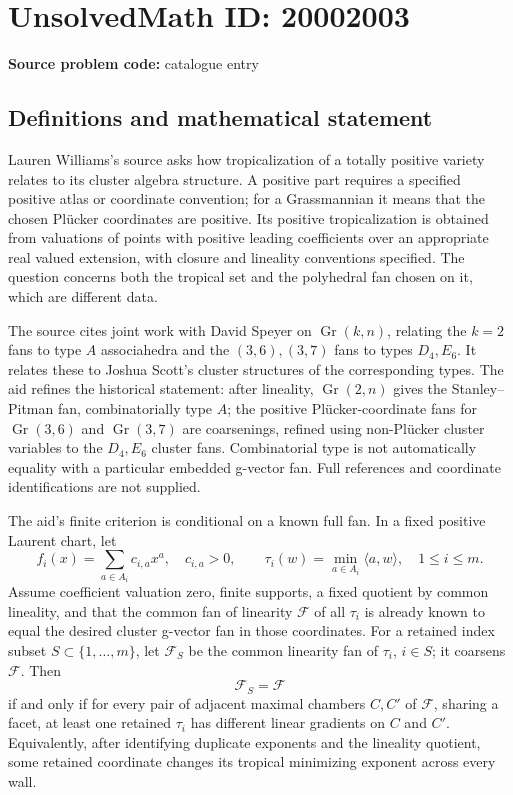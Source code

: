 \documentclass[11pt]{article}
\begin{document}
\section*{UnsolvedMath ID: 20002003}
\textbf{Source problem code:} catalogue entry
\subsection{Definitions and mathematical statement}
Lauren Williams's source asks how tropicalization of a totally positive variety relates to its cluster algebra structure. A positive part requires a specified positive atlas or coordinate convention; for a Grassmannian it means that the chosen Pl\"ucker coordinates are positive. Its positive tropicalization is obtained from valuations of points with positive leading coefficients over an appropriate real valued extension, with closure and lineality conventions specified. The question concerns both the tropical set and the polyhedral fan chosen on it, which are different data.

The source cites joint work with David Speyer on \(\operatorname{Gr}(k,n)\), relating the \(k=2\) fans to type \(A\) associahedra and the \((3,6),(3,7)\) fans to types \(D_4,E_6\). It relates these to Joshua Scott's cluster structures of the corresponding types. The aid refines the historical statement: after lineality, \(\operatorname{Gr}(2,n)\) gives the Stanley--Pitman fan, combinatorially type \(A\); the positive Pl\"ucker-coordinate fans for \(\operatorname{Gr}(3,6)\) and \(\operatorname{Gr}(3,7)\) are coarsenings, refined using non-Pl\"ucker cluster variables to the \(D_4,E_6\) cluster fans. Combinatorial type is not automatically equality with a particular embedded g-vector fan. Full references and coordinate identifications are not supplied.

The aid's finite criterion is conditional on a known full fan. In a fixed positive Laurent chart, let
\[
 f_i(x)=\sum_{a\in A_i}c_{i,a}x^a,\quad c_{i,a}>0,\qquad
 \tau_i(w)=\min_{a\in A_i}\langle a,w\rangle,
 \quad1\leq i\leq m.
\]
Assume coefficient valuation zero, finite supports, a fixed quotient by common lineality, and that the common fan of linearity \(\mathcal F\) of all \(\tau_i\) is already known to equal the desired cluster g-vector fan in those coordinates. For a retained index subset \(S\subset\{1,\ldots,m\}\), let \(\mathcal F_S\) be the common linearity fan of \(\tau_i\), \(i\in S\); it coarsens \(\mathcal F\). Then
\[
 \mathcal F_S=\mathcal F
\]
if and only if for every pair of adjacent maximal chambers \(C,C'\) of \(\mathcal F\), sharing a facet, at least one retained \(\tau_i\) has different linear gradients on \(C\) and \(C'\). Equivalently, after identifying duplicate exponents and the lineality quotient, some retained coordinate changes its tropical minimizing exponent across every wall.
\end{document}
